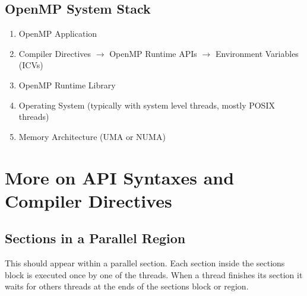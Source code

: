 \documentclass[12pt, a4paper]{report}
\begin{document}
\subsection{OpenMP System Stack}
\begin{enumerate}[label={\bfseries{\alph*)}}]
    \item OpenMP Application
    \item Compiler Directives $\rightarrow$ OpenMP Runtime APIs $\rightarrow$ Environment Variables (ICVs)
    \item OpenMP Runtime Library
    \item Operating System (typically with system level threads, mostly POSIX threads)
    \item Memory Architecture (UMA or NUMA)
\end{enumerate}

\section{More on API Syntaxes and Compiler Directives}
\subsection{Sections in a Parallel Region}
This should appear within a parallel section. Each section inside the sections block is executed once by one of the threads. When a thread
finishes its section it waits for others threads at the ends of the sections block or region.
\end{document}
